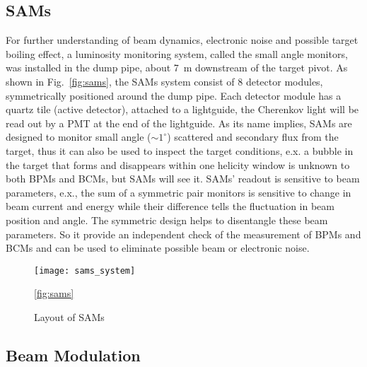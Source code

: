 \subsection{SAMs}
For further understanding of beam dynamics, electronic noise and possible target boiling
effect, a luminosity monitoring system, called the small angle monitors, was
installed in the dump pipe, about 7~m downstream of the target pivot. As shown
in Fig.~\ref{fig:sams}, the SAMs system consist of 8 detector modules, symmetrically 
positioned around the dump pipe. Each detector module has a quartz tile (active 
detector), attached to a lightguide, the Cherenkov light will be read out by a 
PMT at the end of the lightguide. 
As its name implies, SAMs are designed to monitor small angle ($\sim 1^\circ$)
scattered and secondary flux from the target, thus it can also be used to
inspect the target conditions, e.x. a bubble in the target that forms and disappears
within one helicity window is unknown to both BPMs and BCMs, but SAMs will see it.
SAMs' readout is sensitive to beam parameters,
e.x., the sum of a symmetric pair monitors is sensitive to change in beam current
and energy while their difference tells the fluctuation in beam position and angle.
The symmetric design helps to disentangle these beam parameters. So it provide
an independent check of the measurement of BPMs and BCMs and can be used to eliminate
possible beam or electronic noise.

\begin{figure}
    \centering
    \texttt{[image: sams\_system]}
    \caption{Layout of SAMs\cite{AJZ_thesis}}
    \ref{fig:sams}
\end{figure}

\subsection{Beam Modulation}
\begin{comment}
It is very important for PVES to control the systematic uncertainty, especially
the one from beam fluctuation (HCBA). Ideally, the electrons bunches with opposite
polarization should have exactly the same intensity and energy, hitting the target 
at the same place with the same angle, which is obviously impossible in reality. 
So we need to correct the false asymmetry introduce by the beam fluctuation. There are a
few methods to do the correction, one of them is the so called Beam modulation.
The idea is to introduce man-made fluctuations to the beam through the 
modulation system, then we can measure the changes in monitors and detectors 
to find the sensitivities of detectors to changes in energy, position and angle,
which will be used to correct the measured asymmetry.
\end{comment}

